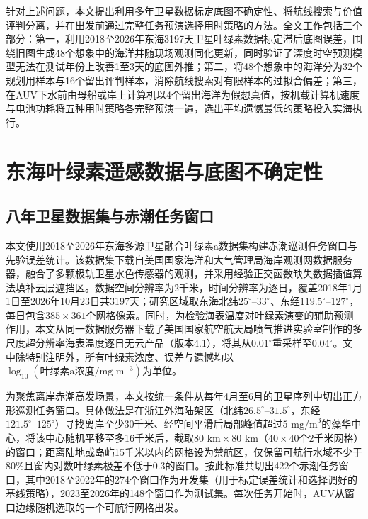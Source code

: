 针对上述问题，本文提出利用多年卫星数据标定底图不确定性、将航线搜索与价值评判分离，并在出发前通过完整任务预演选择用时策略的方法。全文工作包括三个部分：第一，利用2018至2026年东海3197天卫星叶绿素数据标定滞后底图误差，围绕旧图生成48个想象中的海洋并随现场观测同化更新，同时验证了深度时空预测模型无法在测试年份上改善1至3天的底图外推；第二，将48个想象中的海洋分为32个规划用样本与16个留出评判样本，消除航线搜索对有限样本的过拟合偏差；第三，在AUV下水前由母船或岸上计算机以4个留出海洋为假想真值，按机载计算机速度与电池功耗将五种用时策略各完整预演一遍，选出平均遗憾最低的策略投入实海执行。

\section{东海叶绿素遥感数据与底图不确定性}

\subsection{八年卫星数据集与赤潮任务窗口}

本文使用2018至2026年东海多源卫星融合叶绿素a数据集构建赤潮巡测任务窗口与先验误差统计。该数据集下载自美国国家海洋和大气管理局海岸观测网数据服务器，融合了多颗极轨卫星水色传感器的观测，并采用经验正交函数缺失数据插值算法填补云层遮挡区\cite{beckers2003dineof}。数据空间分辨率为2千米，时间分辨率为逐日，覆盖2018年1月1日至2026年10月23日共3197天；研究区域取东海北纬$25^\circ\text{--}33^\circ$、东经$119.5^\circ\text{--}127^\circ$，每日包含$385\times 361$个网格像素。同时，为检验海表温度对叶绿素演变的辅助预测作用，本文从同一数据服务器下载了美国国家航空航天局喷气推进实验室制作的多尺度超分辨率海表温度逐日无云产品（版本4.1）\cite{chin2017mur}，将其从$0.01^\circ$重采样至$0.04^\circ$。文中除特别注明外，所有叶绿素浓度、误差与遗憾均以$\log_{10}(\text{叶绿素a浓度}/\text{mg m}^{-3})$为单位。

为聚焦离岸赤潮高发场景，本文按统一条件从每年4月至6月的卫星序列中切出正方形巡测任务窗口。具体做法是在浙江外海陆架区（北纬$26.5^\circ\text{--}31.5^\circ$，东经$121.5^\circ\text{--}125^\circ$）寻找离岸至少30千米、经空间平滑后局部峰值超过$5\text{ mg/m}^3$的藻华中心，将该中心随机平移至多16千米后，截取$80\text{ km}\times 80\text{ km}$（$40\times 40$个2千米网格）的窗口；距离陆地或岛屿15千米以内的网格设为禁航区，仅保留可航行水域不少于80\%且窗内对数叶绿素极差不低于0.3的窗口。按此标准共切出422个赤潮任务窗口，其中2018至2022年的274个窗口作为开发集（用于标定误差统计和选择调好的基线策略），2023至2026年的148个窗口作为测试集。每次任务开始时，AUV从窗口边缘随机选取的一个可航行网格出发。

